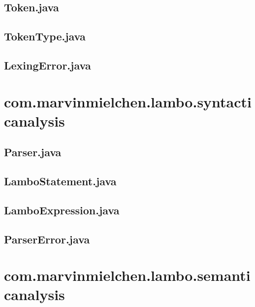 \documentclass{article}
\begin{document}
\subsection{Token.java}


\subsection{TokenType.java}


\subsection{LexingError.java}


\section{com.marvinmielchen.lambo.syntacticanalysis}

\subsection{Parser.java}


\subsection{LamboStatement.java}


\subsection{LamboExpression.java}


\subsection{ParserError.java}


\section{com.marvinmielchen.lambo.semanticanalysis}
\end{document}
